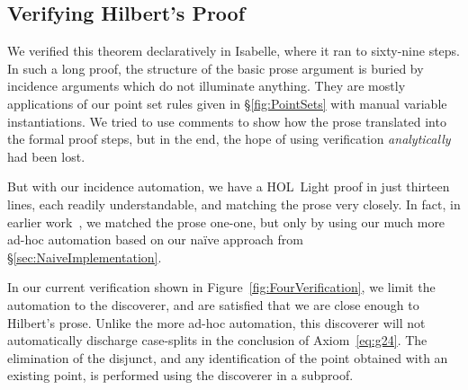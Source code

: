 \subsection{Verifying Hilbert's Proof}
We verified this theorem declaratively in Isabelle, where it ran to sixty-nine steps. In such a long proof, the structure of the basic prose argument is buried by incidence arguments which do not illuminate anything. They are mostly applications of our point set rules given in \S\ref{fig:PointSets} with manual variable instantiations. We tried to use comments to show how the prose translated into the formal proof steps, but in the end, the hope of using verification \emph{analytically} had been lost.

But with our incidence automation, we have a HOL~Light proof in just thirteen lines, each readily understandable, and matching the prose very closely. In fact, in earlier work~\cite{ScottExploring}, we matched the prose one-one, but only by using our much more ad-hoc automation based on our na\"{i}ve approach from \S\ref{sec:NaiveImplementation}. 

In our current verification shown in Figure~\ref{fig:FourVerification}, we limit the automation to the  discoverer, and are satisfied that we are close enough to Hilbert's prose. Unlike the more ad-hoc automation, this discoverer will not automatically discharge case-splits in the conclusion of Axiom~\ref{eq:g24}. The elimination of the disjunct, and any identification of the point obtained with an existing point, is performed using the  discoverer in a subproof.

